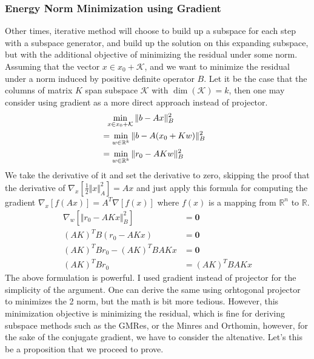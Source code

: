 \documentclass[]{article}
\theoremstyle{definition}
\begin{document}
        \subsubsection{Energy Norm Minimization using Gradient}\label{sec:Energy_Norm_Minimization_using_Gradient}
            Other times, iterative method will choose to build up a subspace for each step with a subspace generator, and build up the solution on this expanding subspace, but with the additional objective of minimizing the residual under some norm. Assuming that the vector $x\in x_0 + \mathcal{K}$, and we want to minimize the residual under a norm induced by positive definite operator $B$. Let it be the case that the columns of matrix $K$ span subspace $\mathcal{K}$ with $\dim(\mathcal K) = k$, then one may consider using gradient as a more direct approach instead of projector. 
            \begin{align}
                &\hspace{0.6em} \min_{x\in x_0 + \mathcal{K}} \Vert b - Ax\Vert_B^2 
                \\
                &= \min_{w\in \mathbb{R}^{k}} 
                \Vert b - A(x_0 + Kw)\Vert_B^2 & 
                \\
                &= \min_{w\in \mathbb{R}^{k}} 
                \Vert 
                    r_0 - AKw
                \Vert_B^2
            \end{align}
            We take the derivative of it and set the derivative to zero, skipping the proof that the derivative of $\nabla_x[\frac{1}{2}\Vert x\Vert_A^2] = Ax$ and just apply this formula for computing the gradient $\nabla_x[f(Ax)] = A^T\nabla [f(x)]$ where $f(x)$ is a mapping from $\mathbb R^n$ to $\mathbb R$. 
            \begin{align}
                \nabla_w \left[
                    \Vert r_0 - AKx\Vert_B^2
                \right] &= \mathbf{0}
                \\
                (AK)^TB(r_0 - AKx) &= \mathbf{0}
                \\
                (AK)^TBr_0 - (AK)^TBAKx &= \mathbf{0}
                \\
                (AK)^TBr_0 &= (AK)^TBAKx
            \end{align}
            The above formulation is powerful. I used gradient instead of projector for the simplicity of the argument. One can derive the same using orhtogonal projector to minimizes the 2 norm, but the math is bit more tedious. However, this minimization objective is minimizing the residual, which is fine for deriving subspace methods such as the GMRes, or the Minres and Orthomin, however, for the sake of the conjugate gradient, we have to consider the altenative. Let's this be a proposition that we proceed to prove. 
\end{document}
